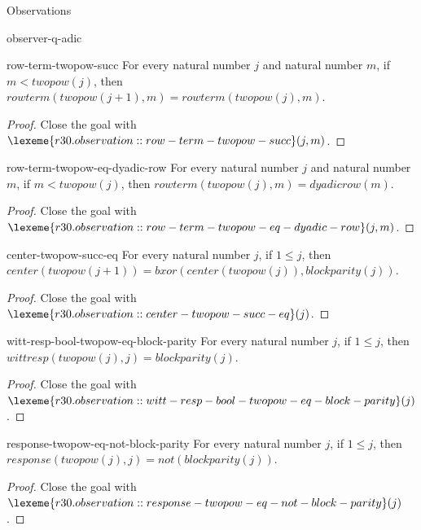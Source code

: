 \begin{lexlean}{Observations}
\begin{section}{observer-q-adic}
\begin{theorem}{row-term-twopow-succ}
For every natural number \(j\) and natural number \(m\), if \(m < twopow(j)\), then \(rowterm(twopow(j + 1), m) = rowterm(twopow(j), m)\).
\begin{proof}
Close the goal with \(\lexeme{r30.observation::row-term-twopow-succ}(j, m)\).
\end{proof}
\end{theorem}

\begin{theorem}{row-term-twopow-eq-dyadic-row}
For every natural number \(j\) and natural number \(m\), if \(m < twopow(j)\), then \(rowterm(twopow(j), m) = dyadicrow(m)\).
\begin{proof}
Close the goal with \(\lexeme{r30.observation::row-term-twopow-eq-dyadic-row}(j, m)\).
\end{proof}
\end{theorem}

\begin{theorem}{center-twopow-succ-eq}
For every natural number \(j\), if \(1 ≤ j\), then \(center(twopow(j + 1)) = bxor(center(twopow(j)), blockparity(j))\).
\begin{proof}
Close the goal with \(\lexeme{r30.observation::center-twopow-succ-eq}(j)\).
\end{proof}
\end{theorem}

\begin{theorem}{witt-resp-bool-twopow-eq-block-parity}
For every natural number \(j\), if \(1 ≤ j\), then \(wittresp(twopow(j), j) = blockparity(j)\).
\begin{proof}
Close the goal with \(\lexeme{r30.observation::witt-resp-bool-twopow-eq-block-parity}(j)\).
\end{proof}
\end{theorem}

\begin{theorem}{response-twopow-eq-not-block-parity}
For every natural number \(j\), if \(1 ≤ j\), then \(response(twopow(j), j) = not(blockparity(j))\).
\begin{proof}
Close the goal with \(\lexeme{r30.observation::response-twopow-eq-not-block-parity}(j)\).
\end{proof}
\end{theorem}


\end{section}
\end{lexlean}
